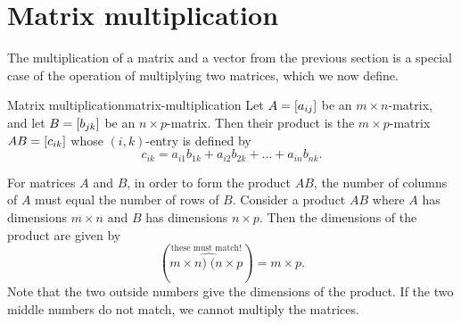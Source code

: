 \section{Matrix multiplication}

The multiplication of a matrix and a vector from the previous section
is a special case of the operation of multiplying two matrices, which
we now define.

\begin{definition}{Matrix multiplication}{matrix-multiplication}
  Let $A=\left[a_{ij}\right]$ be an $m\times n$-matrix, and let
  $B=\left[b_{jk}\right]$ be an $n\times p$-matrix. Then their product%
   is the
  $m\times p$-matrix $AB=\left[c_{ik}\right]$ whose $(i,k)$-entry is defined
  by
  \begin{equation*}
    c_{ik} = a_{i1}b_{1k} + a_{i2}b_{2k} + \ldots + a_{in}b_{nk}.
  \end{equation*}
\end{definition}

For matrices $A$ and $B$, in order to form the product $AB$, the
number of columns of $A$ must equal the number of rows of
$B$. Consider a product $AB$ where $A$ has dimensions $m\times n$ and
$B$ has dimensions $n \times p$. Then the dimensions of the product
are given by
\begin{equation*}
  (\overset{\text{these must match!}}{m\times\widehat{n)\;(n}\times p})=m\times p.
\end{equation*}
Note that the two outside numbers give the dimensions of the
product. If the two middle numbers do not match, we cannot multiply
the matrices.

